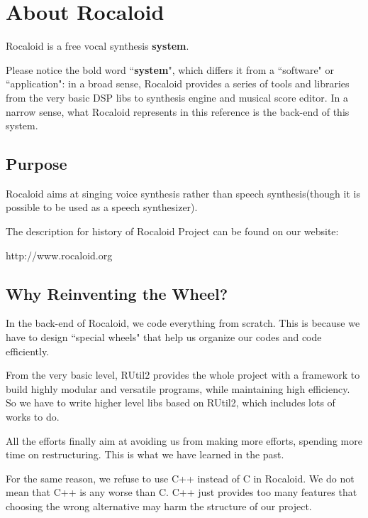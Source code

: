\section{About Rocaloid}\indent

        Rocaloid is a free vocal synthesis \textbf{system}.
        
        Please notice the bold word ``\textbf{system}", which differs it from a ``software" or ``application": in a broad sense, Rocaloid provides a series of tools and libraries from the very basic DSP libs to synthesis engine and musical score editor. In a narrow sense, what Rocaloid represents in this reference is the back-end of this system.

\subsection{Purpose}\indent

        Rocaloid aims at singing voice synthesis rather than speech synthesis(though it is possible to be used as a speech synthesizer).
        
        The description for history of Rocaloid Project can be found on our website:
        
        http://www.rocaloid.org
        
\subsection{Why Reinventing the Wheel?}\indent

        In the back-end of Rocaloid, we code everything from scratch. This is because we have to design ``special wheels" that help us organize our codes and code efficiently.
        
        From the very basic level, RUtil2 provides the whole project with a framework to build highly modular and versatile programs, while maintaining high efficiency. So we have to write higher level libs based on RUtil2, which includes lots of works to do.
        
        All the efforts finally aim at avoiding us from making more efforts, spending more time on restructuring. This is what we have learned in the past.
        
        For the same reason, we refuse to use C++ instead of C in Rocaloid. We do not mean that C++ is any worse than C. C++ just provides too many features that choosing the wrong alternative may harm the structure of our project.


